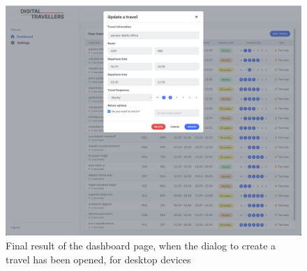 \documentclass[./memory.tex]{subfiles}
\begin{document}
\begin{figure}[H]
	\centering
	\includegraphics[width=\textwidth]{./assets/results/desktop-update.png}
	\caption{Final result of the dashboard page, when the dialog to create a
		travel has been opened, for desktop devices}
\end{figure}
\end{document}
